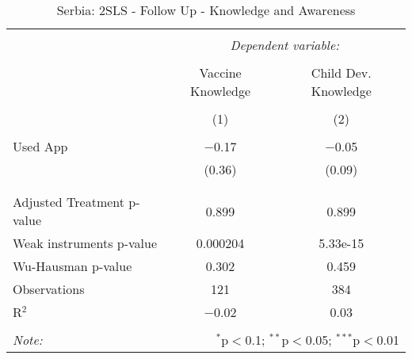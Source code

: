 
\begin{table}[!htbp] \centering 
  \caption{Serbia: 2SLS - Follow Up - Knowledge and Awareness} 
  \label{tbl:Serbia: 2SLS - Follow Up - Knowledge and Awareness} 
\begin{tabular}{@{\extracolsep{5pt}}lcc} 
\\[-1.8ex]\hline 
\hline \\[-1.8ex] 
 & \multicolumn{2}{c}{\textit{Dependent variable:}} \\ 
\cline{2-3} 
\\[-1.8ex] & Vaccine Knowledge & Child Dev. Knowledge \\ 
\\[-1.8ex] & (1) & (2)\\ 
\hline \\[-1.8ex] 
 Used App & $-$0.17 & $-$0.05 \\ 
  & (0.36) & (0.09) \\ 
  & & \\ 
\hline \\[-1.8ex] 
Adjusted Treatment p-value & 0.899 & 0.899 \\ 
Weak instruments p-value & 0.000204 & 5.33e-15 \\ 
Wu-Hausman p-value & 0.302 & 0.459 \\ 
Observations & 121 & 384 \\ 
R$^{2}$ & $-$0.02 & 0.03 \\ 
\hline 
\hline \\[-1.8ex] 
\textit{Note:}  & \multicolumn{2}{r}{$^{*}$p$<$0.1; $^{**}$p$<$0.05; $^{***}$p$<$0.01} \\ 
\end{tabular} 
\end{table} 
